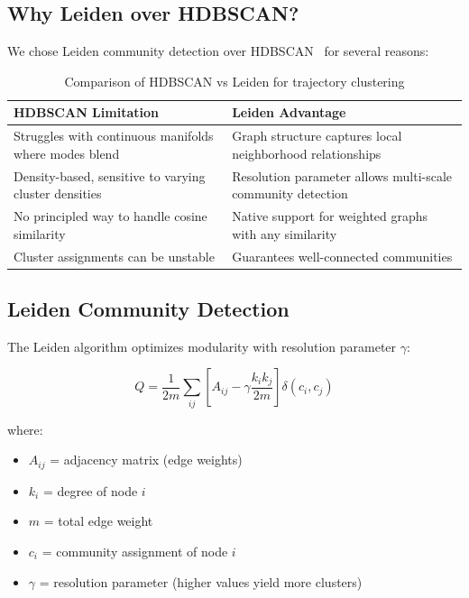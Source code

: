 \documentclass{article}
\begin{document}
\subsection{Why Leiden over HDBSCAN?}

We chose Leiden community detection over HDBSCAN~\cite{campello2013density} for several reasons:

\begin{table}[h]
\centering
\begin{tabular}{p{6cm}p{6cm}}
\toprule
\textbf{HDBSCAN Limitation} & \textbf{Leiden Advantage} \\
\midrule
Struggles with continuous manifolds where modes blend & Graph structure captures local neighborhood relationships \\
Density-based, sensitive to varying cluster densities & Resolution parameter allows multi-scale community detection \\
No principled way to handle cosine similarity & Native support for weighted graphs with any similarity \\
Cluster assignments can be unstable & Guarantees well-connected communities \\
\bottomrule
\end{tabular}
\caption{Comparison of HDBSCAN vs Leiden for trajectory clustering}
\end{table}

\subsection{Leiden Community Detection}

The Leiden algorithm optimizes modularity with resolution parameter $\gamma$:

\begin{equation}
    Q = \frac{1}{2m} \sum_{ij} \left[ A_{ij} - \gamma \frac{k_i k_j}{2m} \right] \delta(c_i, c_j)
\end{equation}

where:
\begin{itemize}
    \item $A_{ij}$ = adjacency matrix (edge weights)
    \item $k_i$ = degree of node $i$
    \item $m$ = total edge weight
    \item $c_i$ = community assignment of node $i$
    \item $\gamma$ = resolution parameter (higher values yield more clusters)
\end{itemize}
\end{document}
